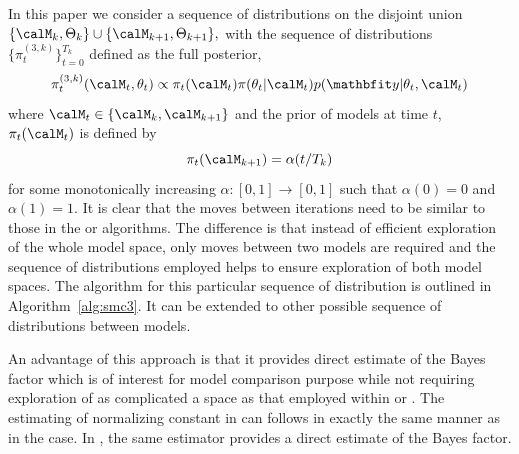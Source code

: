 In this paper we consider a sequence of distributions on the disjoint union
$\{\calM_k,\Theta_k\}\cup\{\calM_{k+1},\Theta_{k+1}\},$ with the sequence of
distributions $\{\pi_t^{(3,k)}\}_{t=0}^{T_k}$ defined as the full posterior,
\begin{equation}
  \pi_t^{(3,k)}(\calM_t,\theta_t) \propto
  \pi_t(\calM_t) \pi(\theta_t|\calM_t) p(\data|\theta_t,\calM_t)
\end{equation}
where $\calM_t\in\{\calM_k,\calM_{k+1}\}$ and the prior of models at time $t$,
$\pi_t(\calM_t)$ is defined by
\begin{equation}
  \pi_t(\calM_{k+1}) = \alpha(t/T_k)
  \label{eq:smc3_prior}
\end{equation}
for some monotonically increasing $\alpha:[0,1]\to[0,1]$ such that $\alpha(0)
= 0$ and $\alpha(1) = 1$. It is clear that the \mcmc moves between iterations
need to be similar to those in the \rjmcmc or \smc[1] algorithms. The
difference is that instead of efficient exploration of the whole model space,
only moves between two models are required and the sequence of distributions
employed helps to ensure exploration of both model spaces. The algorithm for
this particular sequence of distribution is outlined in
Algorithm~\ref{alg:smc3}. It can be extended to other possible sequence of
distributions between models.

An advantage of this approach is that it provides direct estimate of the Bayes
factor which is of interest for model comparison purpose while not requiring
exploration of as complicated a space as that employed within \rjmcmc or
\smc[1]. The estimating of normalizing constant in \smc[3] can follows in
exactly the same manner as in the \smc[2] case. In \smc[3], the same
estimator provides a direct estimate of the Bayes factor.




